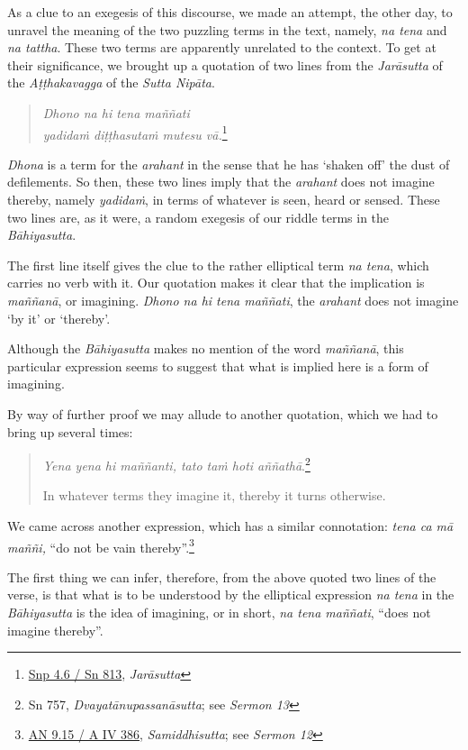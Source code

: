 As a clue to an exegesis of this discourse, we made an attempt, the other day, to unravel the meaning of the two puzzling terms in the text, namely, \emph{na tena} and \emph{na tattha}. These two terms are apparently unrelated to the context. To get at their significance, we brought up a quotation of two lines from the \emph{Jarāsutta} of the \emph{Aṭṭhakavagga} of the \emph{Sutta Nipāta}.

\begin{quote}
\emph{Dhono na hi tena maññati}\\
\emph{yadidaṁ diṭṭhasutaṁ mutesu vā.}\footnote{\href{https://suttacentral.net/snp4.6/pli/ms}{Snp 4.6 / Sn 813}, \emph{Jarāsutta}}
\end{quote}

\emph{Dhona} is a term for the \emph{arahant} in the sense that he has `shaken off' the dust of defilements. So then, these two lines imply that the \emph{arahant} does not imagine thereby, namely \emph{yadidaṁ}, in terms of whatever is seen, heard or sensed. These two lines are, as it were, a random exegesis of our riddle terms in the \emph{Bāhiyasutta}.

The first line itself gives the clue to the rather elliptical term \emph{na tena}, which carries no verb with it. Our quotation makes it clear that the implication is \emph{maññanā}, or imagining. \emph{Dhono na hi tena maññati}, the \emph{arahant} does not imagine `by it' or `thereby'.

Although the \emph{Bāhiyasutta} makes no mention of the word \emph{maññanā}, this particular expression seems to suggest that what is implied here is a form of imagining.

By way of further proof we may allude to another quotation, which we had to bring up several times:

\begin{quote}
\emph{Yena yena hi maññanti, tato taṁ hoti aññathā}.\footnote{Sn 757, \emph{Dvayatānupassanāsutta}; see \emph{Sermon 13}}

In whatever terms they imagine it, thereby it turns otherwise.
\end{quote}

We came across another expression, which has a similar connotation: \emph{tena ca mā maññi,} ``do not be vain thereby''.\footnote{\href{https://suttacentral.net/an9.15/pli/ms}{AN 9.15 / A IV 386}, \emph{Samiddhisutta}; see \emph{Sermon 12}}

The first thing we can infer, therefore, from the above quoted two lines of the verse, is that what is to be understood by the elliptical expression \emph{na tena} in the \emph{Bāhiyasutta} is the idea of imagining, or in short, \emph{na tena maññati}, ``does not imagine thereby''.

